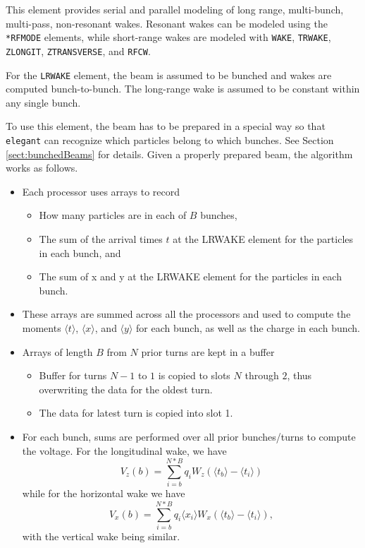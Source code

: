 This element provides serial and parallel modeling of long range, multi-bunch, multi-pass, non-resonant wakes.
Resonant wakes can be modeled using the \verb|*RFMODE| elements, while short-range wakes are modeled with
\verb|WAKE|, \verb|TRWAKE|, \verb|ZLONGIT|, \verb|ZTRANSVERSE|, and \verb|RFCW|.

For the \verb|LRWAKE| element, the beam is assumed to be bunched and wakes are computed bunch-to-bunch.
The long-range wake is assumed to be constant within any single bunch.

To use this element, the beam has to be prepared in a special way so that {\tt elegant} can recognize which
particles belong to which bunches.
See Section \ref{sect:bunchedBeams} for details.
Given a properly prepared beam, the algorithm works as follows.
\begin{itemize}
\item Each processor uses arrays to record
\begin{itemize}
  \item How many particles are in each of $B$ bunches,
  \item The sum of the arrival times $t$ at the LRWAKE element for the particles in each bunch, and
  \item The sum of x and y at the LRWAKE element for the particles in each bunch.
  \end{itemize}
\item These arrays are summed across all the processors and used to compute the moments
  $\langle t \rangle$, $\langle x \rangle$, and $\langle y \rangle$ for each bunch, as
  well as the charge in each bunch.
\item Arrays of length $B$ from $N$ prior turns are kept in a buffer
  \begin{itemize}
  \item Buffer for turns $N-1$ to $1$ is copied to slots $N$ through $2$, thus overwriting the data for
    the oldest turn.
  \item The data for latest turn is copied into slot 1.
  \end{itemize}
\item  For each bunch, sums are performed over all prior bunches/turns to compute the voltage. For the 
  longitudinal wake, we have
  \begin{equation}
    V_z(b) = \sum\limits_{i=b}^{N*B} q_i W_z(\langle t_b \rangle - \langle t_i \rangle)
  \end{equation}
while for the horizontal wake we have
  \begin{equation}
    V_x(b) = \sum\limits_{i=b}^{N*B} q_i \langle x_i \rangle W_x(\langle t_b \rangle - \langle t_i \rangle),
  \end{equation}
with the vertical wake being similar.
\end{itemize}

